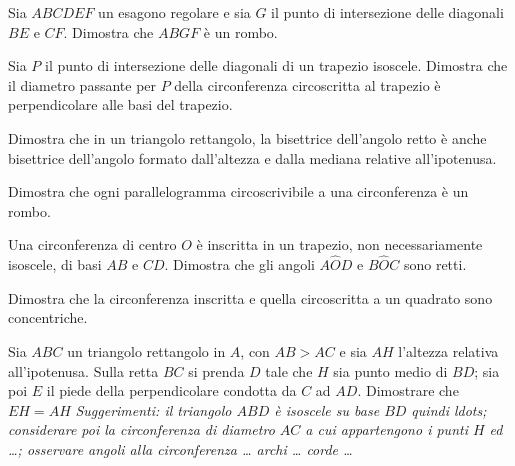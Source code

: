 \begin{esercizio}
\label{ese:5.49}
Sia $ABCDEF$ un esagono regolare e sia $G$ il punto di intersezione delle diagonali $BE$ e $CF$. Dimostra che $ABGF$ è un rombo.
\end{esercizio}

\begin{esercizio}
\label{ese:5.50}
Sia $P$ il punto di intersezione delle diagonali di un trapezio isoscele. Dimostra che il diametro passante per $P$ della circonferenza circoscritta al trapezio è perpendicolare alle basi del trapezio.
\end{esercizio}

\begin{esercizio}
\label{ese:5.51}
Dimostra che in un triangolo rettangolo, la bisettrice dell'angolo retto è anche bisettrice dell'angolo formato dall'altezza e dalla mediana relative all'ipotenusa.
\end{esercizio}

\begin{esercizio}
\label{ese:5.52}
Dimostra che ogni parallelogramma circoscrivibile a una circonferenza è un rombo.
\end{esercizio}

\begin{esercizio}
\label{ese:5.53}
Una circonferenza di centro $O$ è inscritta in un trapezio, non necessariamente isoscele, di basi $AB$ e $CD$. Dimostra che gli angoli $A\widehat{O}D$ e $B\widehat{O}C$ sono retti.
\end{esercizio}

\begin{esercizio}
\label{ese:5.54}
Dimostra che la circonferenza inscritta e quella circoscritta a un quadrato sono concentriche.
\end{esercizio}

\begin{esercizio}
\label{ese:5.55}
Sia $ABC$ un triangolo rettangolo in $A$, con $AB > AC$ e sia $AH$ l'altezza relativa all'ipotenusa. Sulla retta $BC$ si prenda $D$ tale che $H$ sia punto medio di $BD$; sia poi $E$ il piede della perpendicolare condotta da $C$ ad $AD$. Dimostrare che $EH = AH$  \emph{Suggerimenti: il triangolo $ABD$ è isoscele su base $BD$ quindi ldots{}; considerare poi la circonferenza di diametro $AC$ a cui appartengono i punti $H$ ed \ldots{}; osservare angoli alla circonferenza \ldots{} archi \ldots{} corde \ldots{}}
\end{esercizio}

